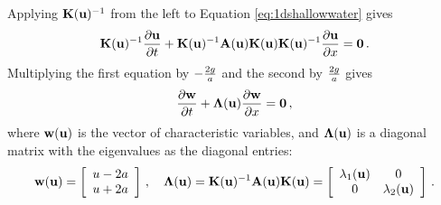 Applying $\mathbf{K}(\mathbf{u})^{-1}$ from the left to Equation
\eqref{eq:1dshallowwater} gives
\begin{equation}
  \mathbf{K}(\mathbf{u})^{-1}\frac{\partial \mathbf{u}}{\partial t}
    + \mathbf{K}(\mathbf{u})^{-1}\mathbf{A}(\mathbf{u})
    \mathbf{K}(\mathbf{u})\mathbf{K}(\mathbf{u})^{-1}
    \frac{\partial \mathbf{u}}{\partial x}
  = \mathbf{0} \,.
\end{equation}
Multiplying the first equation by $-\frac{2g}{a}$ and the 
second by $\frac{2g}{a}$ gives
\begin{equation}
  \frac{\partial \mathbf{w}}{\partial t}
    + \mathbf{\Lambda}(\mathbf{u})\frac{\partial \mathbf{w}}{\partial x}
  = \mathbf{0} \,,
\end{equation}
where $\mathbf{w}(\mathbf{u})$ is the vector of
characteristic variables, and $\mathbf{\Lambda}(\mathbf{u})$ is a
diagonal matrix with the eigenvalues as the diagonal entries:
\begin{equation}
  \mathbf{w}(\mathbf{u}) = \left[\begin{array}{c}
    u - 2a\\
    u + 2a
    \end{array}\right]
    \,, \quad
  \mathbf{\Lambda}(\mathbf{u}) =
    \mathbf{K}(\mathbf{u})^{-1}\mathbf{A}(\mathbf{u})
    \mathbf{K}(\mathbf{u}) =
      \left[\begin{array}{c c}\lambda_1(\mathbf{u}) & 0\\
        0 & \lambda_2(\mathbf{u})\end{array}\right] \,.
\end{equation}




